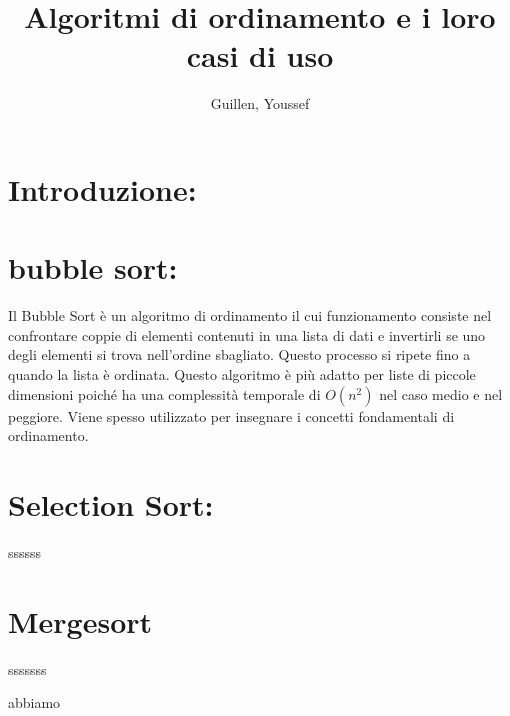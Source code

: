 \documentclass{article}
\author{Guillen, Youssef}
\title{Algoritmi di ordinamento e i loro casi di uso}
\begin{document}
\maketitle
\section*{Introduzione:}
\section*{bubble sort:}
Il Bubble Sort è un algoritmo di ordinamento il cui funzionamento consiste nel confrontare coppie di elementi contenuti in una lista di dati
e invertirli se uno degli elementi si trova nell'ordine sbagliato. Questo processo si ripete 
fino a quando la lista è ordinata. Questo algoritmo è più adatto per liste di piccole dimensioni poiché ha una complessità 
temporale di \(O(n^2)\) nel caso medio e nel peggiore. Viene spesso utilizzato per insegnare i concetti fondamentali di ordinamento.
\begin{figure}[ht!]
    \centering
\end{figure}

\section*{Selection Sort:}
ssssss
\begin{figure}[ht!]
    \centering
\end{figure}
\section*{Mergesort}
sssssss
\begin{figure}[ht!]
    \centering
\end{figure}

abbiamo
\end{document}
